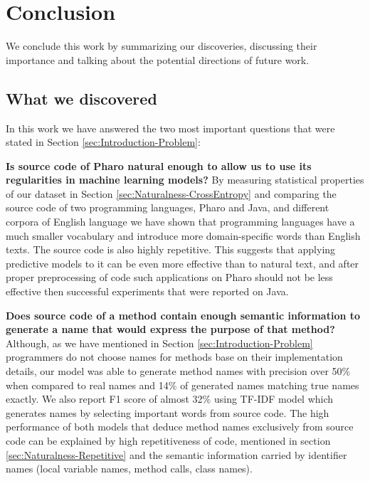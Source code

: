 \chapter{Conclusion}
\label{chap:Conclusion}
\mtoc

We conclude this work by summarizing our discoveries, discussing their importance and talking about the potential directions of future work.

\section{What we discovered}

In this work we have answered the two most important questions that were stated in Section \ref{sec:Introduction-Problem}:

\begin{RQ}
  \item \textbf{Is source code of Pharo natural enough to allow us to use its regularities in machine learning models?} By measuring statistical properties of our dataset in Section \ref{sec:Naturalness-CrossEntropy} and comparing the source code of two programming languages, Pharo and Java, and different corpora of English language we have shown that programming languages have a much smaller vocabulary and introduce more domain-specific words than English texts. The source code is also highly repetitive. This suggests that applying predictive models to it can be even more effective than to natural text, and after proper preprocessing of code such applications on Pharo should not be less effective then successful experiments that were reported on Java.

  \item \textbf{Does source code of a method contain enough semantic information to generate a name that would express the purpose of that method?} Although, as we have mentioned in Section \ref{sec:Introduction-Problem} programmers do not choose names for methods base on their implementation details, our model was able to generate method names with precision over 50\% when compared to real names and 14\% of generated names matching true names exactly. We also report F1 score of almost 32\% using TF-IDF model which generates names by selecting important words from source code. The high performance of both models that deduce method names exclusively from source code can be explained by high repetitiveness of code, mentioned in section \ref{sec:Naturalness-Repetitive} and the semantic information carried by identifier names (local variable names, method calls, class names).
\end{RQ}

